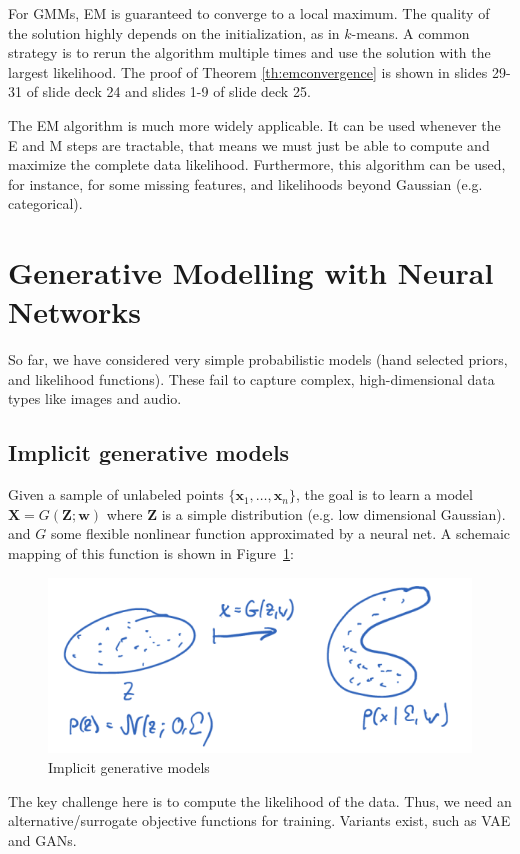 \documentclass[a4paper,10pt,twoside]{article}
\begin{document}
For GMMs, EM is guaranteed to converge to a local maximum. The quality of the solution highly depends on the initialization, as in $k$-means. A common strategy is to rerun the algorithm multiple times and use the solution with the largest likelihood. The proof of Theorem \ref{th:emconvergence} is shown in slides 29-31 of slide deck 24 and slides 1-9 of slide deck 25.

The EM algorithm is much more widely applicable. It can be used whenever the E and M steps are tractable, that means we must just be able to compute and maximize the complete data likelihood. Furthermore, this algorithm can be used, for instance, for some missing features, and likelihoods beyond Gaussian (e.g. categorical).

\section{Generative Modelling with Neural Networks}

So far, we have considered very simple probabilistic models (hand selected priors, and likelihood functions). These fail to capture complex, high-dimensional data types like images and audio.

\subsection{Implicit generative models}

Given a sample of unlabeled points $\{\mathbf{x}_1,\ldots,\mathbf{x}_n\}$, the goal is to learn a model $\mathbf{X}=G(\mathbf{Z};\mathbf{w})$ where $\mathbf{Z}$ is a simple distribution (e.g. low dimensional Gaussian). and $G$ some flexible nonlinear function approximated by a neural net. A schemaic mapping of this function is shown in Figure~\ref{fig:implicit_generative_models}:

\begin{figure}
  \centering
  \includegraphics[width=.5\textwidth]{figures/mapping_generative_models.png}
  \caption{Implicit generative models}
  \label{fig:implicit_generative_models}
\end{figure}

The key challenge here is to compute the likelihood of the data. Thus, we need an alternative/surrogate objective functions for training. Variants exist, such as VAE and GANs.
\end{document}
